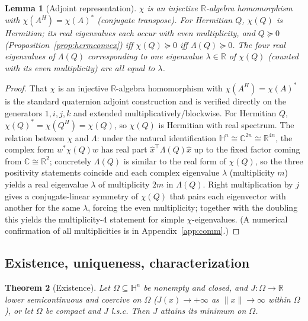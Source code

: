 \documentclass{amsart}
\newtheorem{theorem}{Theorem}
\newtheorem{lemma}[theorem]{Lemma}
\theoremstyle{definition}
\newcommand{\HH}{\mathbb{H}}
\newcommand{\RR}{\mathbb{R}}
\newcommand{\CC}{\mathbb{C}}
\begin{document}
\begin{lemma}[Adjoint representation]
\label{lem:chi}
$\chi$ is an injective $\RR$-algebra homomorphism with
$\chi(A^H)=\chi(A)^{*}$ (conjugate transpose). For Hermitian
$Q$, $\chi(Q)$ is Hermitian; its real eigenvalues each occur with even
multiplicity, and $Q\succeq0$ \textup{(}Proposition~\ref{prop:hermconvex}\textup{)}
iff $\chi(Q)\succeq0$ iff $\Lambda(Q)\succeq0$. The four real
eigenvalues of $\Lambda(Q)$ corresponding to one eigenvalue
$\lambda\in\RR$ of $\chi(Q)$ \textup{(}counted with its even
multiplicity\textup{)} are all equal to $\lambda$.
\end{lemma}

\begin{proof}
That $\chi$ is an injective $\RR$-algebra homomorphism with
$\chi(A^H)=\chi(A)^*$ is the standard quaternion adjoint construction and
is verified directly on the generators $1,i,j,k$ and extended
multiplicatively/blockwise. For Hermitian $Q$, $\chi(Q)^*=\chi(Q^H)
=\chi(Q)$, so $\chi(Q)$ is Hermitian with real spectrum. The relation
between $\chi$ and $\Lambda$: under the natural identification
$\HH^n\cong\CC^{2n}\cong\RR^{4n}$, the complex form $w^*\chi(Q)w$ has
real part $\widehat x^\top\Lambda(Q)\widehat x$ up to the fixed factor
coming from $\CC\cong\RR^2$; concretely $\Lambda(Q)$ is similar to the
real form of $\chi(Q)$, so the three positivity statements coincide and
each complex eigenvalue $\lambda$ (multiplicity $m$) yields a real
eigenvalue $\lambda$ of multiplicity $2m$ in $\Lambda(Q)$. Right
multiplication by $j$ gives a conjugate-linear symmetry of $\chi(Q)$
that pairs each eigenvector with another for the same $\lambda$, forcing
the even multiplicity; together with the doubling this yields the
multiplicity-$4$ statement for simple $\chi$-eigenvalues. (A numerical
confirmation of all multiplicities is in Appendix~\ref{app:comm}.)
\end{proof}

\subsection{Existence, uniqueness, characterization}

\begin{theorem}[Existence]
\label{thm:existence}
Let $\Omega\subseteq\HH^n$ be nonempty and closed, and
$J\colon\Omega\to\RR$ lower semicontinuous and coercive on $\Omega$
\textup{(}$J(x)\to+\infty$ as $\|x\|\to\infty$ within $\Omega$\textup{)},
or let $\Omega$ be compact and $J$ l.s.c. Then $J$ attains its minimum
on $\Omega$.
\end{theorem}
\end{document}
